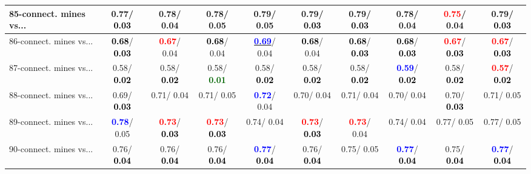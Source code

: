 \begin{table}[h]
\begin{center}
{\begin{tabular}{lc|c|c|c|c|c|c|c|c}
85-connect. mines vs... &   0.77/\textcolor{black}{\textbf{  0.03}} &   0.78/  0.04 &   0.78/  0.05 &   0.79/  0.05 &   0.79/\textcolor{black}{\textbf{  0.03}} &   0.79/\textcolor{black}{\textbf{  0.03}} &   0.78/  0.04 & \textcolor{red}{\textbf{  0.75}}/  0.04 &   0.79/\textcolor{black}{\textbf{  0.03}} \\ \hline
86-connect. mines vs... & \textcolor{black}{\textbf{  0.68}}/\textcolor{black}{\textbf{  0.03}} & \textcolor{red}{\textbf{  0.67}}/  0.04 & \textcolor{black}{\textbf{  0.68}}/  0.04 & \underline{\textcolor{blue}{\textbf{  0.69}}}/  0.04 & \textcolor{black}{\textbf{  0.68}}/  0.04 & \textcolor{black}{\textbf{  0.68}}/\textcolor{black}{\textbf{  0.03}} & \textcolor{black}{\textbf{  0.68}}/\textcolor{black}{\textbf{  0.03}} & \textcolor{red}{\textbf{  0.67}}/\textcolor{black}{\textbf{  0.03}} & \textcolor{red}{\textbf{  0.67}}/\textcolor{black}{\textbf{  0.03}} \\
87-connect. mines vs... &   0.58/\textcolor{black}{\textbf{  0.02}} &   0.58/\textcolor{black}{\textbf{  0.02}} &   0.58/\textcolor{darkgreen}{\textbf{  0.01}} &   0.58/\textcolor{black}{\textbf{  0.02}} &   0.58/\textcolor{black}{\textbf{  0.02}} &   0.58/\textcolor{black}{\textbf{  0.02}} & \textcolor{blue}{\textbf{  0.59}}/\textcolor{black}{\textbf{  0.02}} &   0.58/\textcolor{black}{\textbf{  0.02}} & \textcolor{red}{\textbf{  0.57}}/\textcolor{black}{\textbf{  0.02}} \\
88-connect. mines vs... &   0.69/\textcolor{black}{\textbf{  0.03}} &   0.71/  0.04 &   0.71/  0.05 & \textcolor{blue}{\textbf{  0.72}}/  0.04 &   0.70/  0.04 &   0.71/  0.04 &   0.70/  0.04 &   0.70/\textcolor{black}{\textbf{  0.03}} &   0.71/  0.05 \\
89-connect. mines vs... & \textcolor{blue}{\textbf{  0.78}}/  0.05 & \textcolor{red}{\textbf{  0.73}}/\textcolor{black}{\textbf{  0.03}} & \textcolor{red}{\textbf{  0.73}}/\textcolor{black}{\textbf{  0.03}} &   0.74/  0.04 & \textcolor{red}{\textbf{  0.73}}/\textcolor{black}{\textbf{  0.03}} & \textcolor{red}{\textbf{  0.73}}/  0.04 &   0.74/  0.04 &   0.77/  0.05 &   0.77/  0.05 \\
90-connect. mines vs... &   0.76/\textcolor{black}{\textbf{  0.04}} &   0.76/\textcolor{black}{\textbf{  0.04}} &   0.76/\textcolor{black}{\textbf{  0.04}} & \textcolor{blue}{\textbf{  0.77}}/\textcolor{black}{\textbf{  0.04}} &   0.76/\textcolor{black}{\textbf{  0.04}} &   0.75/  0.05 & \textcolor{blue}{\textbf{  0.77}}/\textcolor{black}{\textbf{  0.04}} &   0.75/\textcolor{black}{\textbf{  0.04}} & \textcolor{blue}{\textbf{  0.77}}/\textcolor{black}{\textbf{  0.04}} \\

\end{tabular}}
\end{center}
\end{table}

